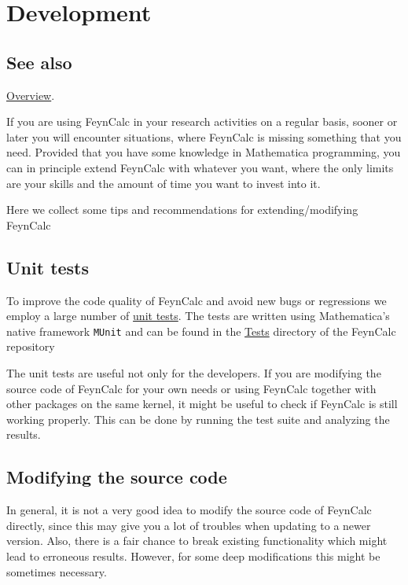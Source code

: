 \documentclass[../FeynCalcManual.tex]{subfiles}
\begin{document}
\hypertarget{development}{
\section{Development}\label{development}}

\subsection{See also}

\hyperlink{toc}{Overview}.

If you are using FeynCalc in your research activities on a regular
basis, sooner or later you will encounter situations, where FeynCalc is
missing something that you need. Provided that you have some knowledge
in Mathematica programming, you can in principle extend FeynCalc with
whatever you want, where the only limits are your skills and the amount
of time you want to invest into it.

Here we collect some tips and recommendations for extending/modifying
FeynCalc

\subsection{Unit tests}\label{unit-tests}

To improve the code quality of FeynCalc and avoid new bugs or
regressions we employ a large number of
\href{https://en.wikipedia.org/wiki/Unit_testing}{unit tests}. The tests
are written using Mathematica's native framework \texttt{MUnit} and can
be found in the
\href{https://github.com/FeynCalc/feyncalc/tree/master/Tests}{Tests}
directory of the FeynCalc repository

The unit tests are useful not only for the developers. If you are
modifying the source code of FeynCalc for your own needs or using
FeynCalc together with other packages on the same kernel, it might be
useful to check if FeynCalc is still working properly. This can be done
by running the test suite and analyzing the results.

\subsection{Modifying the source code}\label{modifying-the-source-code}

In general, it is not a very good idea to modify the source code of
FeynCalc directly, since this may give you a lot of troubles when
updating to a newer version. Also, there is a fair chance to break
existing functionality which might lead to erroneous results. However,
for some deep modifications this might be sometimes necessary.
\end{document}
